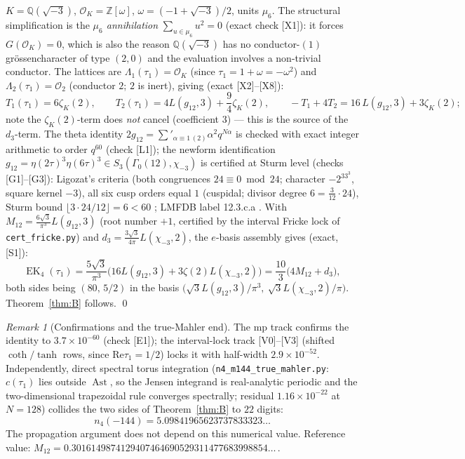 \documentclass[11pt]{article}
\newcommand{\Qq}{\mathbb{Q}}
\newcommand{\Zz}{\mathbb{Z}}
\newcommand{\OO}{\mathcal{O}}
\newcommand{\ReT}{\mathrm{Re}}
\DeclareMathOperator{\EK}{EK}
\DeclareMathOperator{\Ast}{Ast}
\theoremstyle{definition}
\theoremstyle{remark}
\newtheorem{remark}[theorem]{Remark}
\begin{document}
$K=\Qq(\sqrt{-3})$, $\OO_K=\Zz[\omega]$,
$\omega=(-1+\sqrt{-3})/2$, units $\mu_6$. The structural
simplification is the \emph{$\mu_6$ annihilation}
$\sum_{u\in\mu_6}u^2=0$ (exact check [X1]): it forces
$G(\OO_K)=0$, which is also the reason $\Qq(\sqrt{-3})$ has no
conductor-$(1)$ gr\"ossencharacter of type $(2,0)$ and the evaluation
involves a non-trivial conductor. The lattices are
$\Lambda_1(\tau_1)=\OO_K$ (since $\tau_1=1+\omega=-\omega^2$) and
$\Lambda_2(\tau_1)=\OO_2$ (conductor $2$; $2$ is inert), giving
(exact [X2]--[X8]):
\[
  T_1(\tau_1)=6\zeta_K(2),\qquad
  T_2(\tau_1)=4L(g_{12},3)+\frac94\zeta_K(2),\qquad
  -T_1+4T_2=16\,L(g_{12},3)+3\zeta_K(2);
\]
note the $\zeta_K(2)$-term does \emph{not} cancel (coefficient $3$)
--- this is the source of the $d_3$-term. The theta identity
$2g_{12}=\sum'_{\alpha\equiv1\,(2)}\alpha^2q^{N\alpha}$ is checked
with exact integer arithmetic to order $q^{60}$ (check [L1]); the
newform identification
$g_{12}=\eta(2\tau)^3\eta(6\tau)^3\in S_3(\Gamma_0(12),\chi_{-3})$
is certified at Sturm level (checks [G1]--[G3]): Ligozat's criteria
\cite{Lig} (both congruences $24\equiv0\bmod24$; character
$-2^33^3$, square kernel $-3$), all six cusp orders equal $1$
(cuspidal; divisor degree $6=\frac{3}{12}\cdot24$), Sturm bound
$\lfloor3\cdot24/12\rfloor=6<60$ \cite{Sturm}; LMFDB label
\textsf{12.3.c.a} \cite{LMFDB}. With
$M_{12}=\frac{6\sqrt3}{\pi^3}L(g_{12},3)$ (root number $+1$,
certified by the interval Fricke lock of \texttt{cert\_fricke.py}) and $d_3=\frac{3\sqrt3}{4\pi}L(\chi_{-3},2)$, the $e$-basis
assembly gives (exact, [S1]):
\[
  \EK_4(\tau_1)=\frac{5\sqrt3}{\pi^3}
   \bigl(16L(g_{12},3)+3\zeta(2)L(\chi_{-3},2)\bigr)
  =\frac{10}{3}\bigl(4M_{12}+d_3\bigr),
\]
both sides being $(80,\,5/2)$ in the basis
$\bigl(\sqrt3 L(g_{12},3)/\pi^3,\ \sqrt3 L(\chi_{-3},2)/\pi\bigr)$.
Theorem~\ref{thm:B} follows. \qed

\begin{remark}[Confirmations and the true-Mahler end]
The mp track confirms the identity to $3.7\times10^{-60}$ (check
[E1]); the interval-lock track [V0]--[V3] (shifted $\coth/\tanh$
rows, since $\ReT\tau_1=1/2$) locks it with half-width
$2.9\times10^{-52}$. Independently, direct spectral torus integration
(\texttt{n4\_m144\_true\_}\allowbreak\texttt{mahler.py}: $c(\tau_1)$ lies outside $\Ast$,
so the Jensen integrand is real-analytic periodic and the
two-dimensional trapezoidal rule converges spectrally; residual
$1.16\times10^{-22}$ at $N=128$) collides the two sides of
Theorem~\ref{thm:B} to $22$ digits:
\[
  n_4(-144)=5.09841965623737833323\ldots
\]
The propagation argument does not depend on this numerical value.
Reference value:
$M_{12}=0.3016149874129407464690529311477683998854\ldots$\,.
\end{remark}
\end{document}
